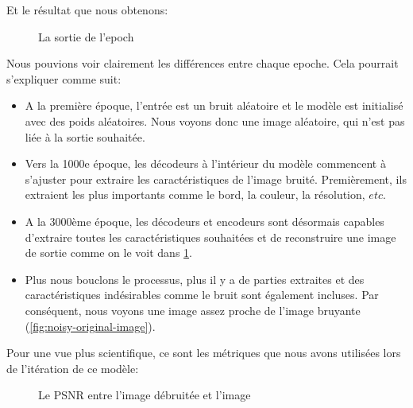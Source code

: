 \documentclass[
  11pt,
  dvipsnames]{article}
\providecommand{\tightlist}{%
  \setlength{\itemsep}{0pt}\setlength{\parskip}{0pt}}
\begin{document}
Et le résultat que nous obtenons:

\begin{figure}

{\centering {}

}

\caption{La sortie de l'epoch}\label{fig:model-epoch-output}
\end{figure}

Nous pouvions voir clairement les différences entre chaque epoche. Cela pourrait s'expliquer comme suit:

\begin{itemize}
\tightlist
\item
  A la première époque, l'entrée est un bruit aléatoire et le modèle est initialisé avec des poids aléatoires. Nous voyons donc une image aléatoire, qui n'est pas liée à la sortie souhaitée.
\item
  Vers la 1000e époque, les décodeurs à l'intérieur du modèle commencent à s'ajuster pour extraire les caractéristiques de l'image bruité. Premièrement, ils extraient les plus importants comme le bord, la couleur, la résolution, \(etc.\)
\item
  A la 3000ème époque, les décodeurs et encodeurs sont désormais capables d'extraire toutes les caractéristiques souhaitées et de reconstruire une image de sortie comme on le voit dans \ref{fig:model-epoch-output}.
\item
  Plus nous bouclons le processus, plus il y a de parties extraites et des caractéristiques indésirables comme le bruit sont également incluses. Par conséquent, nous voyons une image assez proche de l'image bruyante (\ref{fig:noisy-original-image}).
\end{itemize}

Pour une vue plus scientifique, ce sont les métriques que nous avons utilisées lors de l'itération de ce modèle:

\begin{figure}

{\centering {}

}

\caption{Le PSNR entre l'image débruitée et l'image}\label{fig:model-psnr}
\end{figure}
\end{document}
